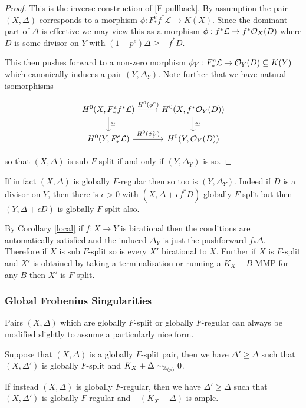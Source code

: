 \begin{proof}
	
	This is the inverse construction of \autoref{F-pullback}. By assumption the pair $(X,\Delta)$ corresponds to a morphism $\phi:F_{*}^{e}f^{*}\mathcal{L} \to K(X)$. Since the dominant part of $\Delta$ is effective we may view this as a morphism $\phi: f^{*}\mathcal{L} \to f^{*}\ox(D)$ where $D$ is some divisor on $Y$ with $(1-p^{e}) \Delta \geq -f^{*}D$.
	
	This then pushes forward to a non-zero morphism $\phi_{Y}:F_{*}^{e}\mathcal{L} \to \ox[Y](D) \subseteq K(Y)$ which canonically induces a pair $(Y,\Delta_{Y})$. Note further that we have natural isomorphisms

	\[\begin{tikzcd}
	{H^{0}(X,F_{*}^{e}f^{*}\mathcal{L})} \arrow[r, "H^{0}(\phi^{e})"] \arrow[d, "\simeq "] & {H^{0}(X,f^{*}\ox[Y](D))} \arrow[d, "\simeq"] \\
	{H^{0}(Y,F_{*}^{e}\mathcal{L})} \arrow[r, "H^{0}(\phi_{Y}^{e})"]                       & {H^{0}(Y,\ox[Y](D))}                         
	\end{tikzcd}\]
	
	so that $(X,\Delta)$ is sub $F$-split if and only if $(Y,\Delta_{Y})$ is so.	
\end{proof}

If in fact $(X,\Delta)$ is globally $F$-regular then so too is $(Y,\Delta_{Y})$. Indeed if $D$ is a divisor on $Y$, then there is $\epsilon > 0$ with $(X,\Delta+\epsilon f^{*}D)$ globally $F$-split but then $(Y,\Delta+\epsilon D)$ is globally $F$-split also.

By Corollary \ref{local} if $f:X \to Y$ is birational then the conditions are automatically satisfied and the induced $\Delta_{Y}$ is just the pushforward $f_{*}\Delta$. Therefore if $X$ is sub $F$-split so is every $X'$ birational to $X$. Further if $X$ is $F$-split and $X'$ is obtained by taking a terminalisation or running a $K_{X}+B$ MMP for any $B$ then $X'$ is $F$-split.

\subsubsection{Global Frobenius Singularities}

Pairs $(X,\Delta)$ which are globally $F$-split or globally $F$-regular can always be modified slightly to assume a particularly nice form.

\begin{lemma}
	
	Suppose that $(X,\Delta)$ is a globally $F$-split pair, then we have $\Delta' \geq \Delta$ such that $(X,\Delta')$ is globally $F$-split and $K_{X}+\Delta \sim_{\zp} 0 $.
	
	If instead $(X,\Delta)$ is globally $F$-regular, then we have $\Delta' \geq \Delta$ such that $(X,\Delta')$ is globally $F$-regular and $-(K_{X}+\Delta)$ is ample.
	
	\end{lemma}

